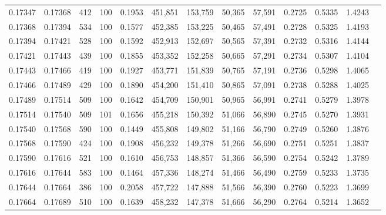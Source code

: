 \begin{tabular}{rrrrrrrrrrrrr}
0.17347 & 0.17368 &   412 & 100 &                                     0.1953 & 451,851 & 153,759 &  50,365 &  57,591 & 0.2725 & 0.5335 & 1.4243 \\
0.17368 & 0.17394 &   534 & 100 &                                     0.1577 & 452,385 & 153,225 &  50,465 &  57,491 & 0.2728 & 0.5325 & 1.4193 \\
0.17394 & 0.17421 &   528 & 100 &                                     0.1592 & 452,913 & 152,697 &  50,565 &  57,391 & 0.2732 & 0.5316 & 1.4144 \\
0.17421 & 0.17443 &   439 & 100 &                                     0.1855 & 453,352 & 152,258 &  50,665 &  57,291 & 0.2734 & 0.5307 & 1.4104 \\
0.17443 & 0.17466 &   419 & 100 &                                     0.1927 & 453,771 & 151,839 &  50,765 &  57,191 & 0.2736 & 0.5298 & 1.4065 \\
0.17466 & 0.17489 &   429 & 100 &                                     0.1890 & 454,200 & 151,410 &  50,865 &  57,091 & 0.2738 & 0.5288 & 1.4025 \\
0.17489 & 0.17514 &   509 & 100 &                                     0.1642 & 454,709 & 150,901 &  50,965 &  56,991 & 0.2741 & 0.5279 & 1.3978 \\
0.17514 & 0.17540 &   509 & 101 &                                     0.1656 & 455,218 & 150,392 &  51,066 &  56,890 & 0.2745 & 0.5270 & 1.3931 \\
0.17540 & 0.17568 &   590 & 100 &                                     0.1449 & 455,808 & 149,802 &  51,166 &  56,790 & 0.2749 & 0.5260 & 1.3876 \\
0.17568 & 0.17590 &   424 & 100 &                                     0.1908 & 456,232 & 149,378 &  51,266 &  56,690 & 0.2751 & 0.5251 & 1.3837 \\
0.17590 & 0.17616 &   521 & 100 &                                     0.1610 & 456,753 & 148,857 &  51,366 &  56,590 & 0.2754 & 0.5242 & 1.3789 \\
0.17616 & 0.17644 &   583 & 100 &                                     0.1464 & 457,336 & 148,274 &  51,466 &  56,490 & 0.2759 & 0.5233 & 1.3735 \\
0.17644 & 0.17664 &   386 & 100 &                                     0.2058 & 457,722 & 147,888 &  51,566 &  56,390 & 0.2760 & 0.5223 & 1.3699 \\
0.17664 & 0.17689 &   510 & 100 &                                     0.1639 & 458,232 & 147,378 &  51,666 &  56,290 & 0.2764 & 0.5214 & 1.3652 \\

\end{tabular}

